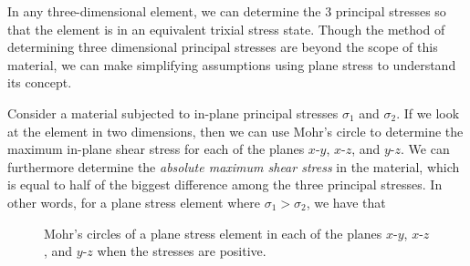 \documentclass[
10pt,
a4paper,
openany,
svgnames,
]{book} %
\begin{document}
In any three-dimensional element, we can determine the 3 principal stresses so that the element is in an equivalent trixial stress state. Though the method of determining three dimensional principal stresses are beyond the scope of this material, we can make simplifying assumptions using plane stress to understand its concept.

Consider a material subjected to in-plane principal stresses $\sigma_1$ and $\sigma_2$. If we look at the element in two dimensions, then we can use Mohr's circle to determine the maximum in-plane shear stress for each of the planes $x$-$y$, $x$-$z$, and $y$-$z$. We can furthermore determine the \emph{absolute maximum shear stress} in the material, which is equal to half of the biggest difference among the three principal stresses. In other words, for a plane stress element where $\sigma_1 > \sigma_2$, we have that

\begin{figure}[h]
  \centering
  \caption{Mohr's circles of a plane stress element in each of the planes $x$-$y$, $x$-$z$, and $y$-$z$ when the stresses are positive.}
\end{figure}
\end{document}
